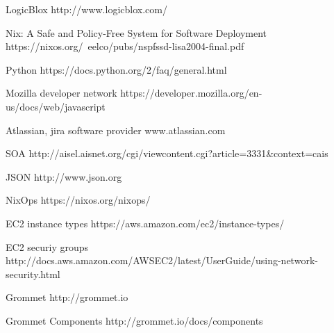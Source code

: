 {
\begin{thebibliography}{9}
LogicBlox http://www.logicblox.com/

Nix: A Safe and Policy-Free System for Software Deployment https://nixos.org/~eelco/pubs/nspfssd-lisa2004-final.pdf

Python https://docs.python.org/2/faq/general.html

Mozilla developer network https://developer.mozilla.org/en-us/docs/web/javascript

Atlassian, jira software provider www.atlassian.com

SOA http://aisel.aisnet.org/cgi/viewcontent.cgi?article=3331\&context=cais

JSON http://www.json.org

NixOps https://nixos.org/nixops/

EC2 instance types https://aws.amazon.com/ec2/instance-types/

EC2 securiy groups http://docs.aws.amazon.com/AWSEC2/latest/UserGuide/using-network-security.html

Grommet http://grommet.io

Grommet Components http://grommet.io/docs/components

\end{thebibliography}
}
